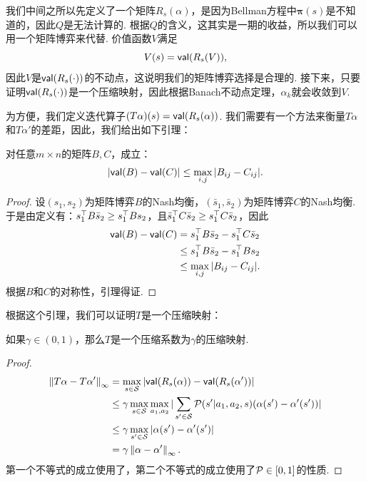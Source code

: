 我们中间之所以先定义了一个矩阵$R_s(\alpha)$，是因为Bellman方程中$\boldsymbol{\pi}(s)$是不知道的，因此$Q$是无法计算的. 根据$Q$的含义，这其实是一期的收益，所以我们可以用一个矩阵博弈来代替. 价值函数$V$满足
\[V(s)=\mathsf{val}(R_s(V)),\]
因此$V$是$\mathsf{val}(R_s(\cdot))$的不动点，这说明我们的矩阵博弈选择是合理的. 接下来，只要证明$\mathsf{val}(R_s(\cdot))$是一个压缩映射，因此根据Banach不动点定理，$\alpha_k$就会收敛到$V$.

为方便，我们定义迭代算子$(T\alpha)(s) = \mathsf{val}(R_s(\alpha))$. 我们需要有一个方法来衡量$T\alpha$和$T\alpha'$的差距，因此，我们给出如下引理：

\begin{lemma}\label{lemma:matrix-game}
对任意$m\times n$的矩阵$B,C$，成立：
\[|\mathsf{val}(B)-\mathsf{val}(C)| \leq \max_{i,j}|B_{ij} - C_{ij}|.\]
\end{lemma}

\begin{proof}
设$(s_1,s_2)$为矩阵博弈$B$的Nash均衡，$(\bar{s}_1,\bar{s}_2)$为矩阵博弈$C$的Nash均衡. 于是由定义有：$s_1^\top B\bar{s}_2  \ge s_1^\top  B s_2$，且$\bar{s}_1 ^\top  C\bar{s}_2 \ge s_1^\top  C \bar{s}_2 $，因此
\begin{align*}
    \mathsf{val}(B)-\mathsf{val}(C) &= s_1^\top B\bar{s}_2 - s_1^\top  C\bar{s}_2 \\
    &\leq s_1^\top  B\bar{s}_2  - s_1^\top  B s_2 \\
    &\leq \max_{i,j}|B_{ij} - C_{ij}|.
\end{align*}
根据$B$和$C$的对称性，引理得证.
\end{proof}

根据这个引理，我们可以证明$T$是一个压缩映射：

\begin{lemma}
    如果$\gamma\in(0,1)$，那么$T$是一个压缩系数为$\gamma$的压缩映射.
\end{lemma}
\begin{proof}
\begin{align*}
    \left\|T\alpha-T\alpha'\right\|_\infty &= \max_{s\in \mathcal S}|\mathsf{val} (R_s(\alpha)) - \mathsf{val}(R_s(\alpha'))| \\
    &\leq \gamma \max_{s\in \mathcal S} \max_{a_1,a_2}|\sum_{s'\in \mathcal S}\mathcal P(s'|a_1,a_2,s)(\alpha(s') - \alpha'(s'))| \\
    &\leq \gamma \max_{s'\in \mathcal S} |\alpha(s') - \alpha'(s')| \\
    &= \gamma \left\|\alpha-\alpha'\right\|_\infty.
\end{align*}
第一个不等式的成立使用了，第二个不等式的成立使用了$\mathcal P\in[0,1]$的性质. 
\end{proof}

